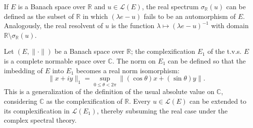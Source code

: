 If $E$ is a Banach space over $\mathbb{R}$ and $u \in \mathcal{L}(E)$, the real spectrum $\sigma_{\mathbb{R}}(u)$ can be defined as the subset of $\mathbb{R}$ in which $(\lambda e - u)$ fails to be an automorphism of $E$. Analogously, the real resolvent of $u$ is the function $\lambda \mapsto (\lambda e - u)^{-1}$ with domain $\mathbb{R} \setminus \sigma_{\mathbb{R}}(u)$.

Let $(E, \|\cdot\|)$ be a Banach space over $\mathbb{R}$; the complexification $E_1$ of the t.v.s. $E$ is a complete normable space over $\mathbb{C}$. The norm on $E_1$ can be defined so that the imbedding of $E$ into $E_1$ becomes a real norm isomorphism:
$$\|x + iy\|_1 = \sup_{0 \leq \theta < 2\pi} \|(\cos \theta)x + (\sin \theta)y\|.$$
This is a generalization of the definition of the usual absolute value on $\mathbb{C}$, considering $\mathbb{C}$ as the complexification of $\mathbb{R}$. Every $u \in \mathcal{L}(E)$ can be extended to its complexification in $\mathcal{L}(E_1)$, thereby subsuming the real case under the complex spectral theory.

